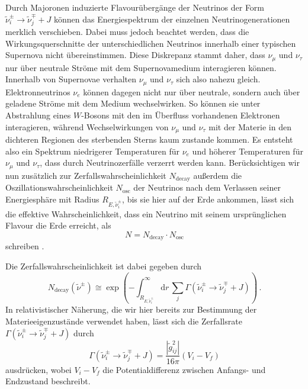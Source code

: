 Durch Majoronen induzierte Flavourübergänge der Neutrinos der Form $\tilde{\nu}^\pm_i \rightarrow \tilde{\nu}^\mp_j + J$ können das Energiespektrum der einzelnen Neutrinogenerationen merklich verschieben. 
Dabei muss jedoch beachtet werden, dass die Wirkungsquerschnitte der unterschiedlichen Neutrinos innerhalb einer typischen Supernova nicht übereinstimmen.
Diese Diskrepanz stammt daher, dass $\nu_\mu$ und $\nu_\tau$ nur über neutrale Ströme mit dem Supernovamedium interagieren können.
Innerhalb von Supernovae verhalten $\nu_\mu$ und $\nu_\tau$ sich also nahezu gleich.
Elektronneutrinos $\nu_e$ können dagegen nicht nur über neutrale, sondern auch über geladene Ströme mit dem Medium wechselwirken.
So können sie unter Abstrahlung eines $W$-Bosons mit den im Überfluss vorhandenen Elektronen interagieren, während Wechselwirkungen von $\nu_\mu$ und $\nu_\tau$ mit der Materie in den dichteren Regionen des sterbenden Sterns kaum zustande kommen.
Es entsteht also ein Spektrum niedrigerer Temperaturen für $\nu_e$ und höherer Temperaturen für $\nu_\mu$ und $\nu_\tau$, dass durch Neutrinozerfälle verzerrt werden kann.
Berücksichtigen wir nun zusätzlich zur Zerfallswahrscheinlichkeit $N_\text{decay}$ außerdem die Oszillationswahrscheinlichkeit $N_\text{osc}$ der Neutrinos nach dem Verlassen seiner Energiesphäre mit Radius $R_{E, \tilde{\nu}^\pm_i}$, 
bis sie hier auf der Erde ankommen, lässt sich die effektive Wahrscheinlichkeit, dass ein Neutrino mit seinem ursprünglichen Flavour die Erde erreicht, als
\begin{equation}
    N = N_\text{decay} \cdot N_\text{osc}
    \label{eq:survivalprob}
\end{equation}
schreiben \cite{supernovaboundsdasandere}.

Die Zerfallswahrscheinlichkeit ist dabei gegeben durch
\begin{equation}
    N_\text{decay}(\tilde{\nu}^\pm) \cong \exp \left(- \int^\infty_{R_{E, \tilde{\nu}^\pm_i}} \mathrm{d}r \, \sum_j \Gamma(\tilde{\nu}^\pm_i \rightarrow \tilde{\nu}^\mp_j + J) \right) \,.
    \label{eq:zerfallswkeit}
\end{equation}
In relativistischer Näherung, die wir hier bereits zur Bestimmung der Materieeigenzustände verwendet haben, lässt sich die Zerfallsrate $\Gamma(\tilde{\nu}^\pm_i \rightarrow \tilde{\nu}^\mp_j + J)$ durch
\begin{equation}
    \Gamma(\tilde{\nu}^\pm_i \rightarrow \tilde{\nu}^\mp_j + J) = \frac{|\tilde{g}^2_{i j}|}{16 \pi} \left(V_i - V_f \right)
    \label{eq:zerfallsrate}
\end{equation}
ausdrücken, wobei $V_i - V_f$ die Potentialdifferenz zwischen Anfangs- und Endzustand beschreibt.


